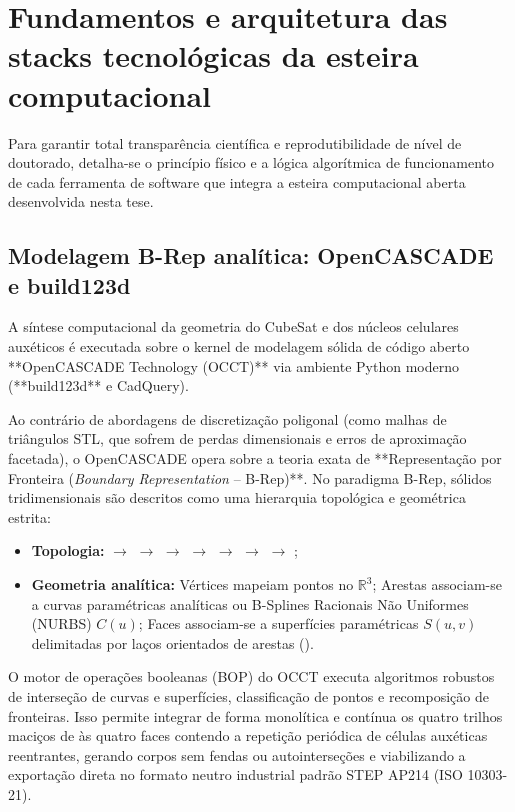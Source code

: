 \section{Fundamentos e arquitetura das stacks tecnológicas da esteira computacional}
\label{sec:stacks-tecnologicas}

Para garantir total transparência científica e reprodutibilidade de nível de doutorado, detalha-se o princípio físico e a lógica algorítmica de funcionamento de cada ferramenta de software que integra a esteira computacional aberta desenvolvida nesta tese.

\subsection{Modelagem B-Rep analítica: OpenCASCADE e build123d}
\label{subsec:opencascade-stack}

A síntese computacional da geometria do CubeSat e dos núcleos celulares auxéticos é executada sobre o kernel de modelagem sólida de código aberto **OpenCASCADE Technology (OCCT)** via ambiente Python moderno (**build123d** e CadQuery). 

Ao contrário de abordagens de discretização poligonal (como malhas de triângulos STL, que sofrem de perdas dimensionais e erros de aproximação facetada), o OpenCASCADE opera sobre a teoria exata de **Representação por Fronteira (\textit{Boundary Representation} -- B-Rep)**. No paradigma B-Rep, sólidos tridimensionais são descritos como uma hierarquia topológica e geométrica estrita:
\begin{itemize}
  \item \textbf{Topologia:}  $\to$  $\to$  $\to$  $\to$  $\to$  $\to$  $\to$ ;
  \item \textbf{Geometria analítica:} Vértices mapeiam pontos no $\mathbb{R}^3$; Arestas associam-se a curvas paramétricas analíticas ou B-Splines Racionais Não Uniformes (NURBS) $C(u)$; Faces associam-se a superfícies paramétricas $S(u, v)$ delimitadas por laços orientados de arestas ().
\end{itemize}

O motor de operações booleanas (BOP) do OCCT executa algoritmos robustos de interseção de curvas e superfícies, classificação de pontos e recomposição de fronteiras. Isso permite integrar de forma monolítica e contínua os quatro trilhos maciços de \rail{} às quatro faces contendo a repetição periódica de células auxéticas reentrantes, gerando corpos sem fendas ou autointerseções e viabilizando a exportação direta no formato neutro industrial padrão STEP AP214 (ISO 10303-21).

